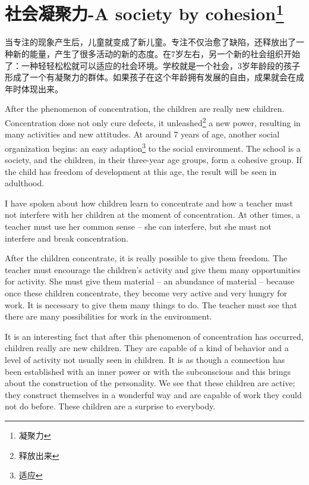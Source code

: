 \documentclass[lang=cn,10pt]{elegantbook}
\begin{document}
\chapter{社会凝聚力-A society by cohesion\footnote{凝聚力}}

当专注的现象产生后，儿童就变成了新儿童。专注不仅治愈了缺陷，还释放出了一种新的能量，产生了很多活动的新的态度。在7岁左右，另一个新的社会组织开始了：一种轻轻松松就可以适应的社会环境。学校就是一个社会，3岁年龄段的孩子形成了一个有凝聚力的群体。如果孩子在这个年龄拥有发展的自由，成果就会在成年时体现出来。

After the phenomenon of concentration, the children are really new children. Concentration dose not only cure defects, it unleashed\footnote{释放出来} a new power, resulting in many activities and new attitudes. At around 7 years of age, another social organization begins: an easy adaption\footnote{适应} to the social environment. The school is a society, and the children, in their three-year age groups, form a cohesive group. If the child has freedom of development at this age, the result will be seen in adulthood.

I have spoken about how children learn to concentrate and how a teacher must not interfere with her children at the moment of concentration. At other times, a teacher must use her common sense – she can interfere, but she must not interfere and break concentration.

After the children concentrate, it is really possible to give them freedom. The teacher must encourage the children's activity and give them many opportunities for activity. She must give them material – an abundance of material – because once these children concentrate, they become very active and very hungry for work. It is necessary to give them many things to do. The teacher must see that there are many possibilities for work in the environment.

It is an interesting fact that after this phenomenon of concentration has occurred, children really are new children. They are capable of a kind of behavior and a level of activity not usually seen in children. It is as though a connection has been established with an inner power or with the subconscious and this brings about the construction of the personality. We see that these children are active; they construct themselves in a wonderful way and are capable of work they could not do before. These children are a surprise to everybody.
\end{document}
